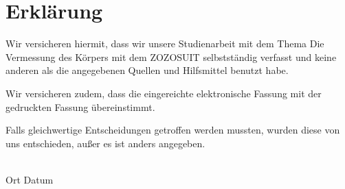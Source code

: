 \chapter*{Erklärung}
\label{ch:erklaerung}

Wir versicheren hiermit, dass wir unsere 
Studienarbeit
 mit dem Thema 
\glqq{}Die Vermessung des Körpers mit dem ZOZOSUIT\grqq{}
 selbstständig verfasst und keine anderen als die angegebenen Quellen und Hilfsmittel benutzt habe.

Wir versicheren zudem, dass die eingereichte elektronische Fassung mit der gedruckten Fassung übereinstimmt.

Falls gleichwertige Entscheidungen getroffen werden mussten, wurden diese von uns
entschieden, außer es ist anders angegeben.

\vspace{2.0cm}
\underline{\hspace{12cm}}\\
Ort \hspace{3cm} Datum \hspace{2cm} 
\makeatletter
\@author
\makeatother